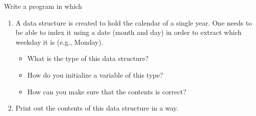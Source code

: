 Write a program in which
\begin{enumerate}
  \item A data structure is created to hold the calendar of a single year. One needs to be able to index it using a date (month and day) in order to extract which weekday it is (e.g., Monday).
    \begin{itemize}
      \item What is the type of this data structure?
      \item How do you initialize a variable of this type?
      \item How can you make sure that the contents is correct?
    \end{itemize}
  \item Print out the contents of this data structure in a  way.
\end{enumerate}
